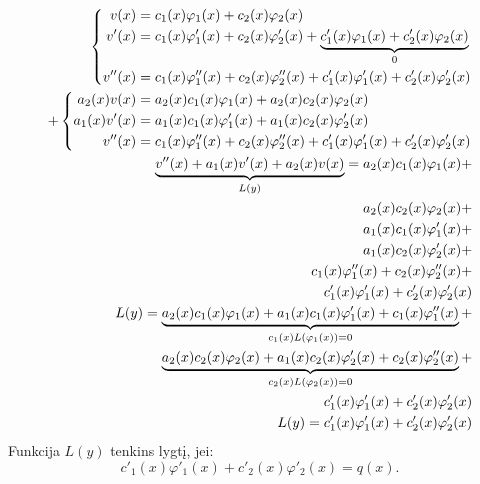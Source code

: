 \begin{align*}
  \left\{%
  \begin{aligned}
    v(x) &= c_{1}(x) \varphi_{1}(x) + c_{2}(x) \varphi_{2}(x) \\
    v'(x) &= c_{1}(x) \varphi'_{1}(x) + c_{2}(x) \varphi'_{2}(x) + %
      \underbrace{c'_{1}(x) \varphi_{1}(x) + c'_{2}(x) \varphi_{2}(x)}_{%
      0} \\
    v''(x) &= c_{1}(x) \varphi''_{1}(x) + c_{2}(x) \varphi''_{2}(x) + %
      c'_{1}(x) \varphi'_{1}(x) + c'_{2}(x) \varphi'_{2}(x) \\
  \end{aligned}
  \right. \\
  +\left\{%
  \begin{aligned}
    a_{2}(x)v(x) &=%
      a_{2}(x)c_{1}(x) \varphi_{1}(x) +%
      a_{2}(x)c_{2}(x) \varphi_{2}(x) \\
    a_{1}(x)v'(x) &=%
      a_{1}(x)c_{1}(x) \varphi'_{1}(x) +%
      a_{1}(x)c_{2}(x) \varphi'_{2}(x) \\
    v''(x) &= %
      c_{1}(x) \varphi''_{1}(x) + c_{2}(x) \varphi''_{2}(x) + %
      c'_{1}(x) \varphi'_{1}(x) + c'_{2}(x) \varphi'_{2}(x) \\
  \end{aligned}
  \right. \\
  \underbrace{v''(x) + a_{1}(x)v'(x) + a_{2}(x)v(x)}_{L(y)} =%
    a_{2}(x)c_{1}(x) \varphi_{1}(x) + \\
    a_{2}(x)c_{2}(x) \varphi_{2}(x) + \\
    a_{1}(x)c_{1}(x) \varphi'_{1}(x) + \\
    a_{1}(x)c_{2}(x) \varphi'_{2}(x) + \\
    c_{1}(x) \varphi''_{1}(x) + c_{2}(x) \varphi''_{2}(x) + \\
    c'_{1}(x) \varphi'_{1}(x) + c'_{2}(x) \varphi'_{2}(x) \\
  L(y) = %
    \underbrace{
      a_{2}(x)c_{1}(x) \varphi_{1}(x) + 
      a_{1}(x)c_{1}(x) \varphi'_{1}(x) + 
      c_{1}(x) \varphi''_{1}(x)
      }_{c_{1}(x)L(\varphi_{1}(x)) = 0} + \\
    \underbrace{
      a_{2}(x)c_{2}(x) \varphi_{2}(x) +
      a_{1}(x)c_{2}(x) \varphi'_{2}(x) +
      c_{2}(x) \varphi''_{2}(x)
      }_{c_{2}(x)L(\varphi_{2}(x)) = 0} + \\
    c'_{1}(x) \varphi'_{1}(x) +
    c'_{2}(x) \varphi'_{2}(x) \\
  L(y) = c'_{1}(x) \varphi'_{1}(x) + c'_{2}(x) \varphi'_{2}(x) \\
\end{align*}
Funkcija $L(y)$ tenkins lygtį, jei:
\begin{equation*}
  c'_{1}(x) \varphi'_{1}(x) + c'_{2}(x) \varphi'_{2}(x) = q(x).
\end{equation*}

